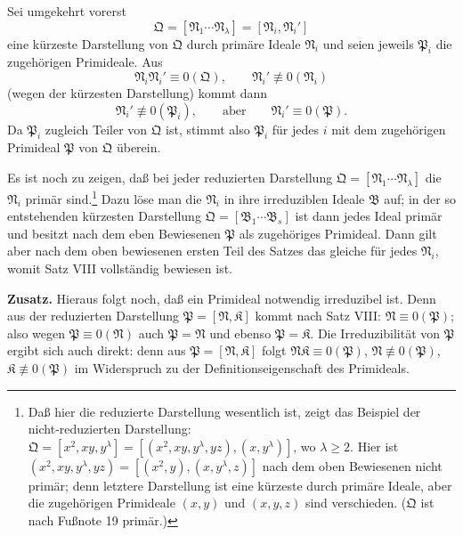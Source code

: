 \documentclass[11pt]{article}
\newcommand{\ideal}[1]{\mathfrak{#1}}
\begin{document}
Sei umgekehrt vorerst
\[
 \ideal Q=[\ideal N_1\cdots\ideal N_\lambda]=[\ideal N_i,\ideal N_i']
\]
eine kürzeste Darstellung von $\ideal Q$ durch primäre Ideale $\ideal N_i$ und seien jeweils $\ideal P_i$ die zugehörigen Primideale. Aus
\[
 \ideal N_i\ideal N_i'\equiv0(\ideal Q),\qquad
 \ideal N_i'\not\equiv0(\ideal N_i)
\]
(wegen der kürzesten Darstellung) kommt dann
\[
 \ideal N_i'\not\equiv0(\ideal P_i),\qquad
 \text{aber}\qquad
 \ideal N_i'\equiv0(\ideal P).
\]
Da $\ideal P_i$ zugleich Teiler von $\ideal Q$ ist, stimmt also $\ideal P_i$ für jedes $i$ mit dem zugehörigen Primideal $\ideal P$ von $\ideal Q$ überein.

Es ist noch zu zeigen, daß bei jeder reduzierten Darstellung $\ideal Q=[\ideal N_1\cdots\ideal N_\lambda]$ die $\ideal N_i$ primär sind.\footnote{Daß hier die reduzierte Darstellung wesentlich ist, zeigt das Beispiel der nicht-reduzierten Darstellung: $\ideal Q=[x^2,xy,y^\lambda]=[(x^2,xy,y^\lambda,yz),(x,y^\lambda)]$, wo $\lambda\ge2$. Hier ist $(x^2,xy,y^\lambda,yz)=[(x^2,y),(x,y^\lambda,z)]$ nach dem oben Bewiesenen nicht primär; denn letztere Darstellung ist eine kürzeste durch primäre Ideale, aber die zugehörigen Primideale $(x,y)$ und $(x,y,z)$ sind verschieden. ($\ideal Q$ ist nach Fußnote 19 primär.)} Dazu löse man die $\ideal N_i$ in ihre irreduziblen Ideale $\ideal B$ auf; in der so entstehenden kürzesten Darstellung $\ideal Q=[\ideal B_1\cdots\ideal B_s]$ ist dann jedes Ideal primär und besitzt nach dem eben Bewiesenen $\ideal P$ als zugehöriges Primideal. Dann gilt aber nach dem oben bewiesenen ersten Teil des Satzes das gleiche für jedes $\ideal N_i$, womit Satz VIII vollständig bewiesen ist.

\textbf{Zusatz.} Hieraus folgt noch, daß ein Primideal notwendig irreduzibel ist. Denn aus der reduzierten Darstellung $\ideal P=[\ideal N,\ideal K]$ kommt nach Satz VIII: $\ideal N\equiv0(\ideal P)$; also wegen $\ideal P\equiv0(\ideal N)$ auch $\ideal P=\ideal N$ und ebenso $\ideal P=\ideal K$. Die Irreduzibilität von $\ideal P$ ergibt sich auch direkt: denn aus $\ideal P=[\ideal N,\ideal K]$ folgt $\ideal N\ideal K\equiv0(\ideal P)$, $\ideal N\not\equiv0(\ideal P)$, $\ideal K\not\equiv0(\ideal P)$ im Widerspruch zu der Definitionseigenschaft des Primideals.
\end{document}
